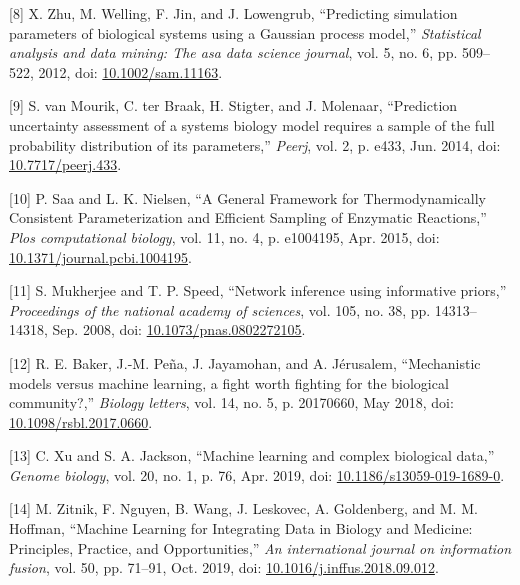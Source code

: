 \documentclass[11pt]{article}
\begin{document}
\hypertarget{citeproc_bib_item_8}{[8] X. Zhu, M. Welling, F. Jin, and J. Lowengrub, “Predicting simulation parameters of biological systems using a Gaussian process model,” \textit{Statistical analysis and data mining: The asa data science journal}, vol. 5, no. 6, pp. 509–522, 2012, doi: \href{https://doi.org/10.1002/sam.11163}{10.1002/sam.11163}.}

\hypertarget{citeproc_bib_item_9}{[9] S. van Mourik, C. ter Braak, H. Stigter, and J. Molenaar, “Prediction uncertainty assessment of a systems biology model requires a sample of the full probability distribution of its parameters,” \textit{Peerj}, vol. 2, p. e433, Jun. 2014, doi: \href{https://doi.org/10.7717/peerj.433}{10.7717/peerj.433}.}

\hypertarget{citeproc_bib_item_10}{[10] P. Saa and L. K. Nielsen, “A General Framework for Thermodynamically Consistent Parameterization and Efficient Sampling of Enzymatic Reactions,” \textit{Plos computational biology}, vol. 11, no. 4, p. e1004195, Apr. 2015, doi: \href{https://doi.org/10.1371/journal.pcbi.1004195}{10.1371/journal.pcbi.1004195}.}

\hypertarget{citeproc_bib_item_11}{[11] S. Mukherjee and T. P. Speed, “Network inference using informative priors,” \textit{Proceedings of the national academy of sciences}, vol. 105, no. 38, pp. 14313–14318, Sep. 2008, doi: \href{https://doi.org/10.1073/pnas.0802272105}{10.1073/pnas.0802272105}.}

\hypertarget{citeproc_bib_item_12}{[12] R. E. Baker, J.-M. Peña, J. Jayamohan, and A. Jérusalem, “Mechanistic models versus machine learning, a fight worth fighting for the biological community?,” \textit{Biology letters}, vol. 14, no. 5, p. 20170660, May 2018, doi: \href{https://doi.org/10.1098/rsbl.2017.0660}{10.1098/rsbl.2017.0660}.}

\hypertarget{citeproc_bib_item_13}{[13] C. Xu and S. A. Jackson, “Machine learning and complex biological data,” \textit{Genome biology}, vol. 20, no. 1, p. 76, Apr. 2019, doi: \href{https://doi.org/10.1186/s13059-019-1689-0}{10.1186/s13059-019-1689-0}.}

\hypertarget{citeproc_bib_item_14}{[14] M. Zitnik, F. Nguyen, B. Wang, J. Leskovec, A. Goldenberg, and M. M. Hoffman, “Machine Learning for Integrating Data in Biology and Medicine: Principles, Practice, and Opportunities,” \textit{An international journal on information fusion}, vol. 50, pp. 71–91, Oct. 2019, doi: \href{https://doi.org/10.1016/j.inffus.2018.09.012}{10.1016/j.inffus.2018.09.012}.}
\end{document}
